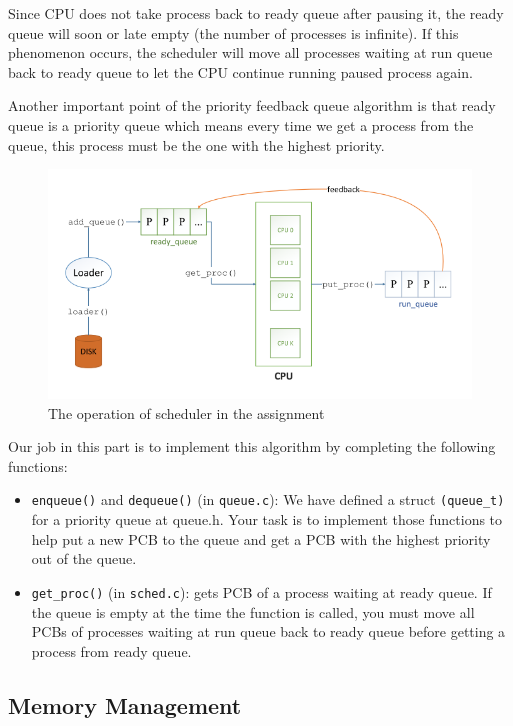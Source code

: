 \documentclass[a4paper]{article}
\numberwithin{equation}{section}
\begin{document}
Since CPU does not take process back to ready queue after pausing it, the ready queue will soon or late empty (the number of processes is infinite). If this phenomenon occurs, the scheduler will move all processes waiting at run queue back to ready queue to let the CPU continue running paused process again.

Another important point of the priority feedback queue algorithm is that ready queue is a priority queue which means every time we get a process from the queue, this process must be the one with the highest priority.

\begin{figure}[H]
    \centering
    \includegraphics[width=1\textwidth]{scheduler.png}
    \caption{The operation of scheduler in the assignment}
    \label{fig:sched_figure}
\end{figure}

Our job in this part is to implement this algorithm by completing the following functions:

\begin{itemize}
    \item \texttt{enqueue()} and \texttt{dequeue()} (in \texttt{queue.c}): We have defined a struct \texttt{(queue_t)}\texttt{} for a priority queue at queue.h. Your task is to implement those functions to help put a new PCB to the queue and get a PCB with the highest priority out of the queue.
    \item \texttt{get_proc()} (in \texttt{sched.c}): gets PCB of a process waiting at ready queue. If the queue is empty at the time the function is called, you must move all PCBs of processes waiting at run queue back to ready queue before getting a process from ready queue.
\end{itemize}

\subsection{Memory Management}
\end{document}
